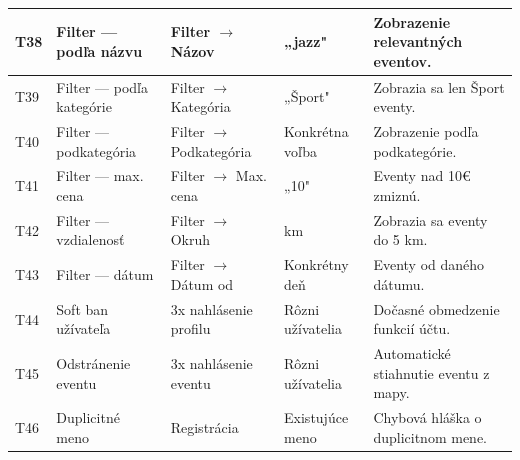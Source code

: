 \documentclass[12pt,a4paper]{article}
\begin{document}
\begin{tabularx}{\textwidth}{@{} l >{\RaggedRight}p{2.5cm} >{\RaggedRight}p{3cm} >{\RaggedRight}p{2.5cm} >{\RaggedRight}X @{} }
T38 & Filter — podľa názvu & Filter $\rightarrow$ Názov & „jazz" & Zobrazenie relevantných eventov. \\ \midrule
T39 & Filter — podľa kategórie & Filter $\rightarrow$ Kategória & „Šport" & Zobrazia sa len Šport eventy. \\ \midrule
T40 & Filter — podkategória & Filter $\rightarrow$ Podkategória & Konkrétna voľba & Zobrazenie podľa podkategórie. \\ \midrule
T41 & Filter — max. cena & Filter $\rightarrow$ Max. cena & „10" & Eventy nad 10€ zmiznú. \\ \midrule
T42 & Filter — vzdialenosť & Filter $\rightarrow$ Okruh & 5 km & Zobrazia sa eventy do 5 km. \\ \midrule
T43 & Filter — dátum & Filter $\rightarrow$ Dátum od & Konkrétny deň & Eventy od daného dátumu. \\ \midrule
T44 & Soft ban užívateľa & 3x nahlásenie profilu & Rôzni užívatelia & Dočasné obmedzenie funkcií účtu. \\ \midrule
T45 & Odstránenie eventu & 3x nahlásenie eventu & Rôzni užívatelia & Automatické stiahnutie eventu z mapy. \\ \midrule
T46 & Duplicitné meno & Registrácia & Existujúce meno & Chybová hláška o duplicitnom mene. \\
\end{tabularx}
\end{document}
